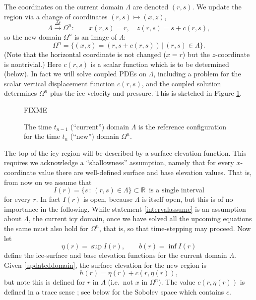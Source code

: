 \documentclass[letterpaper,final,12pt,reqno]{amsart}
\newcommand{\RR}{\mathbb{R}}
\begin{document}
The coordinates on the current domain $\Lambda$ are denoted $(r,s)$.  We update the region via a change of coordinates $(r,s) \mapsto (x,z)$,
\begin{equation}
\Lambda \stackrel{\Delta t}{\to} \Omega^n: \qquad x(r,s)=r, \quad z(r,s)=s+c(r,s), \label{changecoords}
\end{equation}
so the new domain $\Omega^n$ is an image of $\Lambda$:
\begin{equation}
\Omega^n = \{(x,z)=(r,s+c(r,s)) \,\big|\, (r,s) \in \Lambda\}.  \label{updateddomain}
\end{equation}
(Note that the horizontal coordinate is not changed ($x=r$) but the $z$-coordinate is nontrivial.)  Here $c(r,s)$ is a scalar function which is to be determined (below).  In fact we will solve coupled PDEs on $\Lambda$, including a problem for the scalar vertical displacement function $c(r,s)$, and the coupled solution determines $\Omega^n$ plus the ice velocity and pressure.  This is sketched in Figure \ref{fig:domainupdate}.

\begin{figure}[h]

FIXME

\caption{The time $t_{n-1}$ (``current'') domain $\Lambda$ is the reference configuration for the time $t_n$ (``new'') domain $\Omega^n$.}
\label{fig:domainupdate}
\end{figure}

The top of the icy region will be described by a surface elevation function.  This requires we acknowledge a ``shallowness'' assumption, namely that for every $x$-coordinate value there are well-defined surface and base elevation values.  That is, from now on we assume that
\begin{equation}
I(r) = \{s\,:\,(r,s) \in \Lambda\} \subset \RR \, \text{ is a single interval}\label{intervalassume}
\end{equation}
for every $r$.  In fact $I(r)$ is open, because $\Lambda$ is itself open, but this is of no importance in the following.  While statement \eqref{intervalassume} is an assumption about $\Lambda$, the current icy domain, once we have solved all the upcoming equations the same must also hold for $\Omega^n$, that is, so that time-stepping may proceed.  Now let
    $$\eta(r) = \sup I(r), \qquad b(r) = \inf I(r)$$
define the ice-surface and base elevation functions for the current domain $\Lambda$.  Given \eqref{updateddomain}, the surface elevation for the new region is
\begin{equation}
h(r) = \eta(r) + c(r,\eta(r)),  \label{newsurfaceelevation}
\end{equation}
but note this is defined for $r$ in $\Lambda$ (i.e.~not $x$ in $\Omega^n$).  The value $c(r,\eta(r))$ is defined in a trace sense \cite{Evans2010}; see below for the Sobolev space which contains $c$.
\end{document}
